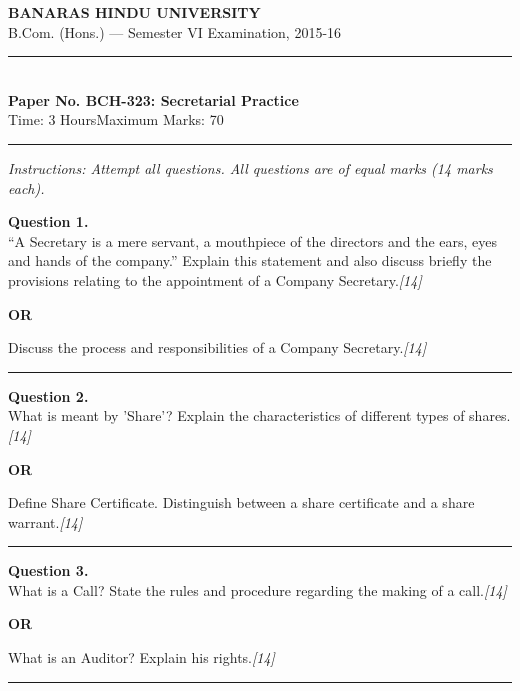 \documentclass[11pt,a4paper]{article}
\newcommand{\pts}[1]{\hfill   \textit{[#1]}}
\begin{document}
\begin{center}
  {\large\bfseries BANARAS HINDU UNIVERSITY}\\[2pt]
  {\normalsize B.Com. (Hons.) --- Semester VI Examination, 2015-16}\\[6pt]
  \rule{0.8\linewidth}{0.5pt}\\[6pt]
  {\large\bfseries Paper No. BCH-323: Secretarial Practice}\\[4pt]
  {\normalsize Time: 3 Hours\hfill Maximum Marks: 70}
\end{center}

\rule{\linewidth}{0.4pt}

\smallskip



\noindent   \textit{Instructions: Attempt all questions. All questions are of equal marks (14 marks each).}

\bigskip




\noindent   \textbf{Question 1.} \\
``A Secretary is a mere servant, a mouthpiece of the directors and the ears, eyes and hands of the company.'' Explain this statement and also discuss briefly the provisions relating to the appointment of a Company Secretary.\pts{14}

\centerline{   \textbf{OR}}

Discuss the process and responsibilities of a Company Secretary.\pts{14}

\medskip\rule{\linewidth}{0.2pt}




\noindent   \textbf{Question 2.} \\
What is meant by 'Share'? Explain the characteristics of different types of shares.\pts{14}

\centerline{   \textbf{OR}}

Define Share Certificate. Distinguish between a share certificate and a share warrant.\pts{14}

\medskip\rule{\linewidth}{0.2pt}

\pagebreak




\noindent   \textbf{Question 3.} \\
What is a Call? State the rules and procedure regarding the making of a call.\pts{14}

\centerline{   \textbf{OR}}

What is an Auditor? Explain his rights.\pts{14}

\medskip\rule{\linewidth}{0.2pt}
\end{document}
